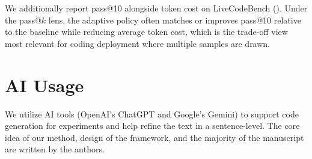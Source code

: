 We additionally report pass@10 alongside token cost on LiveCodeBench (). Under the pass@$k$ lens, the adaptive policy often matches or improves pass@10 relative to the baseline while reducing average token cost, which is the trade-off view most relevant for coding deployment where multiple samples are drawn.

\begin{table}[t]
\centering
\small
\caption{LiveCodeBench pass@$k$ results with token cost. Under pass@10 evaluation, the adaptive policy reduces token cost while maintaining competitive pass@10 performance.}
\label{tab:pass_at_k}
\end{table}

\section{AI Usage}
We utilize AI tools (OpenAI’s ChatGPT and Google’s Gemini) to support code generation for experiments and help refine the text in a sentence-level. The core idea of our method, design of the framework, and the majority of the manuscript are written by the authors.

